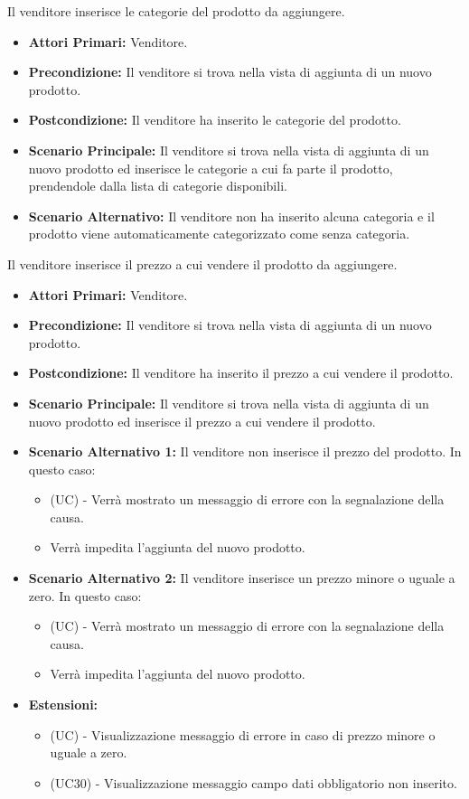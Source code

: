Il venditore inserisce le categorie del prodotto da aggiungere.
\begin{itemize}
    \item \textbf{Attori Primari:} Venditore.
    \item \textbf{Precondizione:} Il venditore si trova nella vista di aggiunta di un nuovo prodotto.
    \item \textbf{Postcondizione:} Il venditore ha inserito le categorie del prodotto.
    \item \textbf{Scenario Principale:} Il venditore si trova nella vista di aggiunta di un nuovo prodotto ed inserisce le categorie a cui fa parte il prodotto, prendendole dalla lista di categorie disponibili.
    \item \textbf{Scenario Alternativo:} Il venditore non ha inserito alcuna categoria e il prodotto viene automaticamente categorizzato come senza categoria.
\end{itemize}

Il venditore inserisce il prezzo a cui vendere il prodotto da aggiungere.
\begin{itemize}
    \item \textbf{Attori Primari:} Venditore.
    \item \textbf{Precondizione:} Il venditore si trova nella vista di aggiunta di un nuovo prodotto.
    \item \textbf{Postcondizione:} Il venditore ha inserito il prezzo a cui vendere il prodotto.
    \item \textbf{Scenario Principale:} Il venditore si trova nella vista di aggiunta di un nuovo prodotto ed inserisce il prezzo a cui vendere il prodotto.
    \item \textbf{Scenario Alternativo 1:} Il venditore non inserisce il prezzo del prodotto. In questo caso:
    \begin{itemize}
        \item (UC) - Verrà mostrato un messaggio di errore con la segnalazione della causa.
        \item Verrà impedita l'aggiunta del nuovo prodotto.
    \end{itemize}
    \item \textbf{Scenario Alternativo 2:} Il venditore inserisce un prezzo minore o uguale a zero. In questo caso:
    \begin{itemize}
        \item (UC) - Verrà mostrato un messaggio di errore con la segnalazione della causa.
        \item Verrà impedita l'aggiunta del nuovo prodotto.
    \end{itemize}
    \item \textbf{Estensioni:}
    \begin{itemize}
        \item (UC) - Visualizzazione messaggio di errore in caso di prezzo minore o uguale a zero.
        \item (UC30) - Visualizzazione messaggio campo dati obbligatorio non inserito.
    \end{itemize}
\end{itemize}


